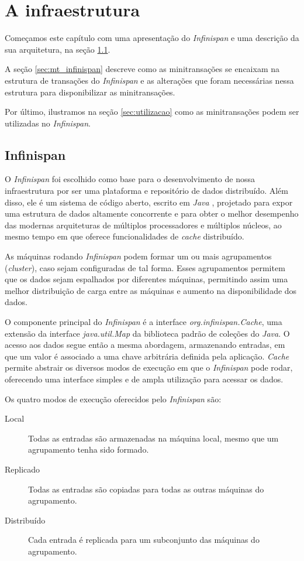 \documentclass[11pt,twoside,a4paper]{book}
\begin{document}
\chapter{A infraestrutura}
\label{chap:implementacao}
Começamos este capítulo com uma apresentação do \emph{Infinispan} e uma
descrição da sua arquitetura, na seção \ref{sec:infinispan}. 

A seção \ref{sec:mt_infinispan} descreve como as minitransações se
encaixam na estrutura de transações do \emph{Infinispan} e as alterações que
foram necessárias nessa estrutura para disponibilizar as minitransações.

Por último, ilustramos na seção \ref{sec:utilizacao} como as minitransações
podem ser utilizadas no \emph{Infinispan}.

\section{Infinispan}
\label{sec:infinispan}
O \emph{Infinispan} foi escolhido como base para o desenvolvimento de nossa
infraestrutura por ser uma plataforma e repositório de dados distribuído. Além
disso, ele é um sistema de código aberto, escrito em \emph{Java} \cite{java},
projetado para expor uma estrutura de dados altamente concorrente e para obter o
melhor desempenho das modernas arquiteturas de múltiplos processadores e
múltiplos núcleos, ao mesmo tempo em que oferece funcionalidades de \emph{cache}
distribuído.

As máquinas rodando \emph{Infinispan} podem formar um ou mais agrupamentos (\emph{cluster}),
caso sejam configuradas de tal forma. Esses agrupamentos permitem que os dados sejam espalhados 
por diferentes máquinas, permitindo assim uma melhor distribuição de carga entre as máquinas e
aumento na disponibilidade dos dados.

O componente principal do \emph{Infinispan} é a interface \emph{org.infinispan.Cache}, uma extensão 
da interface \emph{java.util.Map} da biblioteca padrão de coleções do \emph{Java}. 
O acesso aos dados segue então a mesma abordagem, armazenando entradas, em que um valor é associado a uma 
chave arbitrária definida pela aplicação. \emph{Cache} permite abstrair os diversos 
modos de execução em que o \emph{Infinispan} pode rodar, oferecendo uma interface 
simples e de ampla utilização para acessar os dados.

Os quatro modos de execução oferecidos pelo \emph{Infinispan} são:

\begin{description}
	\item[Local] Todas as entradas são armazenadas na máquina local, mesmo que um agrupamento tenha sido formado.
	\item[Replicado] Todas as entradas são copiadas para todas as outras máquinas do agrupamento.
	\item[Distribuído] Cada entrada é replicada para um subconjunto das máquinas do agrupamento.
\end{description}
\end{document}
